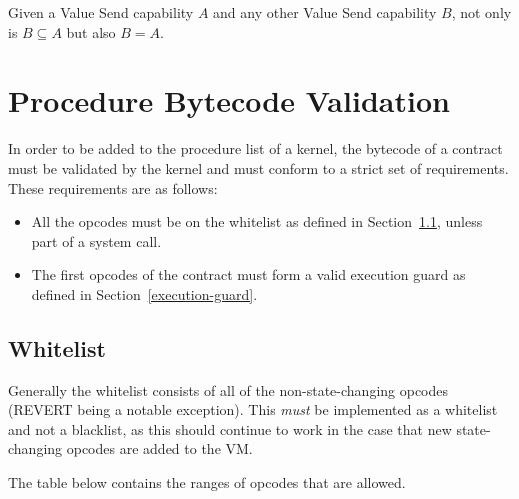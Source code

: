 \documentclass[english,a4paper]{article}
\begin{document}
Given a Value Send capability $A$ and any other Value Send capability $B$, not
only is $B \subseteq A$ but also $B = A$.

\section{Procedure Bytecode Validation}\label{bytecode-validation}
In order to be added to the procedure list of a kernel, the bytecode of a contract must be validated by the kernel and must conform to a strict set of requirements. These requirements are as follows:

\begin{itemize}
  \item All the opcodes must be on the whitelist as defined in Section~\ref{opcode-whitelist}, unless part
  of a system call.
  \item The first opcodes of the contract must form a valid execution guard as
  defined in Section~\ref{execution-guard}.
\end{itemize}


\subsection{Whitelist}\label{opcode-whitelist}
Generally the whitelist consists of all of the non-state-changing opcodes (REVERT being a notable exception). This
\emph{must} be implemented as a whitelist and not a blacklist, as this should
continue to work in the case that new state-changing opcodes are added to the
VM.

The table below contains the ranges of opcodes that are allowed.
\end{document}
